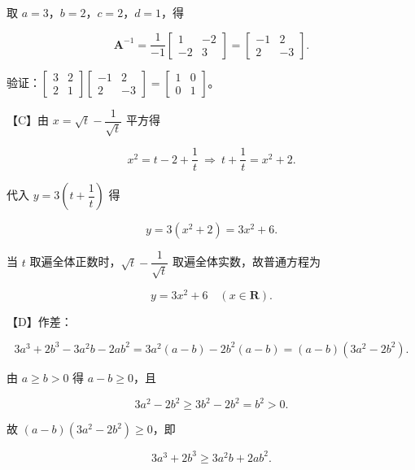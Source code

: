 \begin{answer}
取 $a=3$，$b=2$，$c=2$，$d=1$，得

\nopagebreak[4]
\[\boldsymbol A^{-1}=\frac1{-1}\begin{bmatrix}1&-2\\-2&3\end{bmatrix}=\begin{bmatrix}-1&2\\2&-3\end{bmatrix} .\]

验证：$\begin{bmatrix}3&2\\2&1\end{bmatrix}\begin{bmatrix}-1&2\\2&-3\end{bmatrix}=\begin{bmatrix}1&0\\0&1\end{bmatrix}$。

【C】由 $x=\sqrt t-\dfrac1{\sqrt t}$ 平方得

\nopagebreak[4]
\[x^2=t-2+\frac1t\ \Longrightarrow\ t+\frac1t=x^2+2 .\]

代入 $y=3\left(t+\dfrac1t\right)$ 得

\nopagebreak[4]
\[y=3(x^2+2)=3x^2+6 .\]

当 $t$ 取遍全体正数时，$\sqrt t-\dfrac1{\sqrt t}$ 取遍全体实数，故普通方程为

\nopagebreak[4]
\[y=3x^2+6\quad(x\in\mathbf R).\]

【D】作差：

\nopagebreak[4]
\[3a^3+2b^3-3a^2b-2ab^2=3a^2(a-b)-2b^2(a-b)=(a-b)(3a^2-2b^2) .\]

由 $a\geqslant b>0$ 得 $a-b\geqslant0$，且

\nopagebreak[4]
\[3a^2-2b^2\geqslant3b^2-2b^2=b^2>0 .\]

故 $(a-b)(3a^2-2b^2)\geqslant0$，即

\nopagebreak[4]
\[3a^3+2b^3\geqslant3a^2b+2ab^2 .\]


\end{answer}
